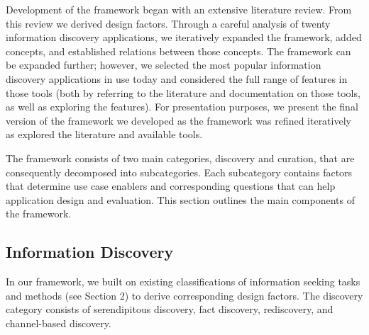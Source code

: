 \documentclass{casconpaper}
\begin{document}
{Development of the framework began with an extensive literature review. From this review we derived design factors. Through a careful analysis of twenty information discovery applications, we iteratively expanded the framework, added concepts, and established relations between those concepts. The framework can be expanded further; however, we selected the most popular information discovery applications in use today   and considered the full range of features in those tools (both by referring to the literature and documentation on those tools, as well as exploring the features). For presentation purposes, we present the final version of the framework we developed as the framework was refined iteratively as explored the literature and available tools. 
 

The framework consists of two main categories, discovery and curation, that are consequently decomposed into subcategories. Each subcategory contains factors that determine use case enablers and corresponding questions that can help application design and evaluation. This section outlines the main components of the framework.

} %

{\subsection{Information Discovery}
In our framework, we built on existing classifications of information seeking tasks and methods (see Section 2) to derive corresponding design factors. The discovery category consists of serendipitous discovery, fact discovery, rediscovery, and channel-based discovery. 
} %
\end{document}
